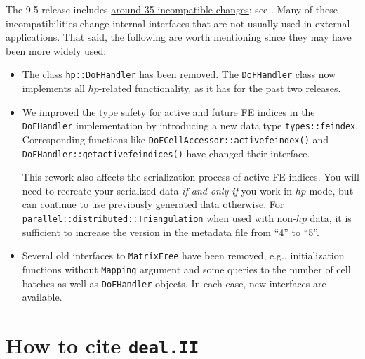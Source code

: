 \documentclass{ansarticle-preprint}
\newcommand{\specialword}[1]{\texttt{#1}}
\newcommand{\dealii}{{\specialword{deal.II}}\xspace}
\begin{document}
The 9.5 release includes
\href{https://dealii.org/developer/doxygen/deal.II/changes_between_9_4_2_and_9_5_0.html}
     {around 35 incompatible changes};
see \cite{changes95}. Many of these
incompatibilities change internal
interfaces that are not usually used in external
applications. That said, the following are worth mentioning since they
may have been more widely used:
\begin{itemize}
  \item
  The class \texttt{hp::DoFHandler} has been removed. The
  \texttt{DoFHandler} class now implements all $hp$-related
  functionality, as it has for the past two releases.

  \item
  We improved the type safety for active and future FE indices in the \texttt{DoFHandler} implementation by introducing a new data type \texttt{types::fe\textunderscore{}index}. Corresponding functions like \texttt{DoFCellAccessor::active\textunderscore{}fe\textunderscore{}index()} and \texttt{DoFHandler::get\textunderscore{}active\textunderscore{}fe\textunderscore{}indices()} have changed their interface.

  This rework also affects the serialization process of active FE
  indices. You will need to recreate your serialized data \textit{if
    and only if} you work in $hp$-mode, but can continue to use
  previously generated data otherwise. For
  \texttt{parallel::distributed::Triangulation} when used with non-$hp$ data, it is sufficient to increase the version in the metadata file from ``4'' to ``5''.

\item Several old interfaces to \texttt{MatrixFree} have been removed, e.g.,
  initialization functions without \texttt{Mapping} argument and some queries
  to the number of cell batches as well as \texttt{DoFHandler} objects. In
  each case, new interfaces are available.
\end{itemize}



\section{How to cite \dealii}\label{sec:cite}
\end{document}
